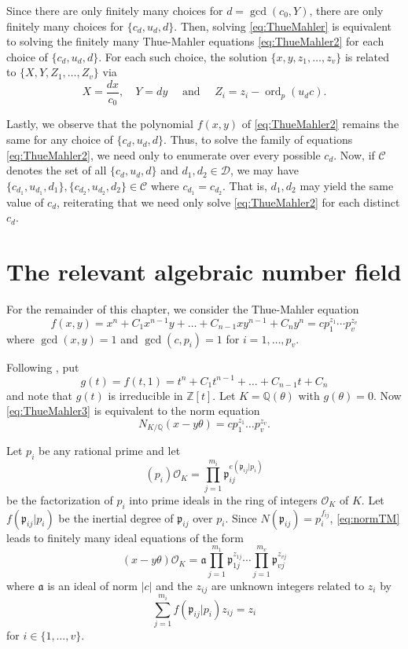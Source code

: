 \documentclass[11pt]{report}
\theoremstyle{definition}
\DeclareMathOperator{\ord}{ord}
\begin{document}
Since there are only finitely many choices for $d = \gcd(c_0, Y)$, there are only finitely many choices for $\{c_d,u_d,d\}$. Then, solving \eqref{eq:ThueMahler} is equivalent to solving the finitely many Thue-Mahler equations \eqref{eq:ThueMahler2} for each choice of $\{c_d,u_d,d\}$.  For each such choice, the solution $\{x,y,z_1, \dots, z_v\}$ is related to $\{X,Y, Z_1, \dots, Z_v\}$ via
\[X = \frac{dx}{c_0},\quad Y=dy \quad \text{ and } \quad Z_i = z_i - \ord_p(u_dc).\]

Lastly, we observe that the polynomial $f(x,y)$ of \eqref{eq:ThueMahler2} remains the same for any choice of $\{c_d,u_d,d\}$. Thus, to solve the family of equations \eqref{eq:ThueMahler2}, we need only to enumerate over every possible $c_d$. Now, if $\mathcal{C}$ denotes the set of all $\{c_d,u_d,d\}$ and $d_1, d_2 \in \mathcal{D}$, we may have $\{c_{d_1},u_{d_1}, d_1\}, \{c_{d_2},u_{d_2}, d_2\} \in \mathcal{C}$ where $c_{d_1} = c_{d_2}$. That is, $d_1, d_2$ may yield the same value of $c_d$, reiterating that we need only solve \eqref{eq:ThueMahler2} for each distinct $c_d$.


\section{The relevant algebraic number field}
\label{sec:RelevantAlgNumField}

For the remainder of this chapter, we consider the Thue-Mahler equation
\begin{equation} \label{eq:ThueMahler3}
f(x,y) = x^n + C_1 x^{n-1}y + \dots + C_{n-1}xy^{n-1} + C_ny^n = c p_1^{z_1} \cdots p_v^{z_v}
\end{equation}
where $\gcd(x,y) = 1$ and $\gcd(c,p_i) = 1$ for $i = 1, \dots, p_v$.

Following \cite{TW3}, put
\[g(t) = f(t,1) = t^n + C_1 t^{n-1} + \dots + C_{n-1}t + C_n\]
and note that $g(t)$ is irreducible in $\mathbb{Z}[t]$. Let $K = \mathbb{Q}(\theta)$ with $g(\theta) = 0$. Now \eqref{eq:ThueMahler3} is equivalent to the norm equation
\begin{equation} \label{eq:normTM}
N_{K/\mathbb{Q}}(x-y\theta) = cp_1^{z_1}\dots p_v^{z_v}.
\end{equation}

Let $p_i$ be any rational prime and let
\[(p_i)\mathcal{O}_K = \prod_{j = 1}^{m_i} \mathfrak{p}_{ij}^{e(\mathfrak{p}_{ij}|p_i)}\]
be the factorization of $p_i$ into prime ideals in the ring of integers $\mathcal{O}_K$ of $K$. Let $f(\mathfrak{p}_{ij}|p_i)$ be the inertial degree of $\mathfrak{p}_{ij}$ over $p_i$. Since $N(\mathfrak{p}_{ij}) = p_i^{f_{ij}}$, \eqref{eq:normTM} leads to finitely many ideal equations of the form
\begin{equation} \label{eq:idealTM}
(x-y\theta)\mathcal{O}_K = \mathfrak{a} \prod_{j = 1}^{m_1} \mathfrak{p}_{1j}^{z_{1j}} \cdots \prod_{j = 1}^{m_v} \mathfrak{p}_{vj}^{z_{vj}}
\end{equation}
where $\mathfrak{a}$ is an ideal of norm $|c|$ and the $z_{ij}$ are unknown integers related to $z_i$ by
\[\sum_{j = 1}^{m_i} f(\mathfrak{p}_{ij}|p_i)z_{ij} = z_i\]
for $i \in \{1, \dots, v\}$.
\end{document}
